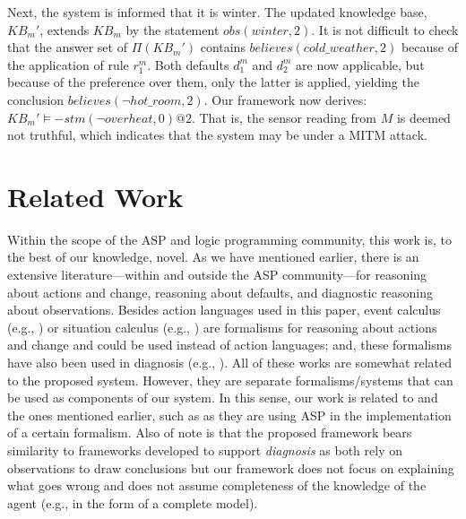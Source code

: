 \documentclass{article}
\newcommand{\memo}[1]{
  \ifthenelse {\boolean{includeMemo}}{\medskip\noindent\fbox{\begin{minipage}[b]{\dimexpr\linewidth-1em}#1\end{minipage}}\medskip\newline} 
}
\begin{document}
Next, the system is informed that it is winter. The updated knowledge base, $KB_m'$, extends $KB_m$ by the statement
$
obs(winter,2).
$
It is not difficult to check that the answer set of $\Pi(KB_m')$ contains $believes(cold\_weather,2)$ because of the application of rule $r^m_1$. Both defaults $d^m_1$ and $d^m_2$ are now applicable, but because of the preference over them, only the latter is applied, yielding the conclusion $believes(\neg hot\_room,2)$. Our framework now derives:
$
KB_m' \models {-}stm(\neg overheat,0)@2.
$
That is, the sensor reading from $M$ is deemed not truthful, which indicates that the system may be under a MITM attack.

   
\section{Related Work }


Within the scope of the ASP and logic programming community, this work is, to the best of our knowledge,  novel. As we have mentioned earlier, there is an extensive literature---within and outside the ASP community---for reasoning about actions and change, reasoning about defaults, and diagnostic reasoning about observations. Besides action languages used in this paper, event calculus (e.g., \cite{KowalskiS86,den92a}) or situation calculus (e.g., \cite{McCarthyH69,Reiter01}) are formalisms for reasoning about actions and change and could be used instead of action languages; and, these formalisms have also been used in diagnosis (e.g., \cite{AriasCCG19,mci-th}). All of these works are somewhat related to the proposed system. However, they are separate formalisms/systems that can be used as components of our system. In this sense, our work is related to    \cite{BalducciniG03b,BalducciniG03} and the ones mentioned earlier, such as \cite{brew99,BrewkaE00,DelgrandeST03,GelfondS98} as they are using ASP  in the implementation of a certain formalism. Also of note is that the proposed framework bears  similarity  to frameworks developed to
support \emph{diagnosis} as both rely on observations to draw conclusions but our framework 
does not focus on explaining what goes wrong and does not assume completeness of the 
knowledge of the agent (e.g., in the form of a complete
model).   
\end{document}
